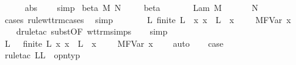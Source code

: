 \begin{isabellebody}
\ \ \ \ \isamarkupfalse%
\ abs\ {}\ {}\ \isamarkupfalse%
\ simp{\isacharplus}\isanewline
{}\isamarkupfalse%
\isanewline
{}\isamarkupfalse%
\ {\isacharparenleft}beta\ M\ N{\isacharparenright}\ \isanewline
\ \ \isamarkupfalse%
\ beta{\isacharparenleft}{}{\isacharparenright}\ \isamarkupfalse%
\ {\isasymtau}\ \ {}{\isacharcolon}\ {\isachardoublequoteopen}{\isasymGamma}\ {\isasymturnstile}\ {\isacharparenleft}Lam\ M{\isacharparenright}\ {\isacharcolon}\ {\isasymtau}\ {\isasymrightarrow}\ {\isasymsigma}{\isachardoublequoteclose}\ {\isachardoublequoteopen}{\isasymGamma}\ {\isasymturnstile}\ N\ {\isacharcolon}\ {\isasymtau}{\isachardoublequoteclose}\ \isanewline
\ \ \ \ \isamarkupfalse%
\ {\isacharparenleft}cases\ rule{\isacharcolon}wt{\isacharunderscore}trm{\isachardot}cases{\isacharparenright}\ \isamarkupfalse%
\ simp\isanewline
\ \ \isamarkupfalse%
\ {}{\isacharparenleft}{}{\isacharparenright}\ \isamarkupfalse%
\ {}{\isacharcolon}\ {\isachardoublequoteopen}{\isasymexists}L{\isachardot}\ finite\ L\ {\isasymand}\ {\isacharparenleft}{\isasymforall}x{\isachardot}\ x\ {\isasymnotin}\ L\ {\isasymlongrightarrow}\ {\isacharparenleft}x{\isacharcomma}\ {\isasymtau}{\isacharparenright}\ {\isacharhash}\ {\isasymGamma}\ {\isasymturnstile}\ M{\isacharcircum}FVar\ x\ {\isacharcolon}\ {\isasymsigma}{\isacharparenright}{\isachardoublequoteclose}\isanewline
\ \ \isamarkupfalse%
\ {\isacharparenleft}drule{\isacharunderscore}tac\ subst{\isacharbrackleft}OF\ wt{\isacharunderscore}trm{\isachardot}simps{\isacharbrackright}{\isacharparenright}\isanewline
\ \ \isamarkupfalse%
\ simp\isanewline
\ \ \isamarkupfalse%
\ \isamarkupfalse%
\ L\ \ {}{\isacharcolon}\ {\isachardoublequoteopen}finite\ L{\isachardoublequoteclose}\ {\isachardoublequoteopen}{\isasymAnd}x{\isachardot}\ x\ {\isasymnotin}\ L\ {\isasymLongrightarrow}\ {\isacharparenleft}x{\isacharcomma}\ {\isasymtau}{\isacharparenright}\ {\isacharhash}\ {\isasymGamma}\ {\isasymturnstile}\ M{\isacharcircum}FVar\ x\ {\isacharcolon}\ {\isasymsigma}{\isachardoublequoteclose}\ \isamarkupfalse%
\ auto\isanewline
\isanewline
\ \ \isamarkupfalse%
\ {\isacharquery}case\isanewline
\ \ \isamarkupfalse%
\ {\isacharparenleft}rule{\isacharunderscore}tac\ L{\isacharequal}L\ \ opn{\isacharunderscore}typ{\isacharparenright}\isanewline

\end{isabellebody}
